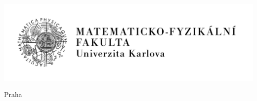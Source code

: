 \pagestyle{empty}
\hypersetup{pageanchor=false}

\begin{center}

\centerline{\mbox{\includegraphics[width=166mm]{img/logo-cs.pdf}}}

\vspace{-8mm}
\vfill

{\bf\Large\ThesisTypeTitle}

\vfill

{\LARGE\ThesisAuthor}

\vspace{15mm}

{\LARGE\bfseries\ThesisTitle\par}

\vfill

\Department

\vfill

{
\centerline{\vbox{}}}

\vfill

Praha \YearSubmitted

\end{center}

